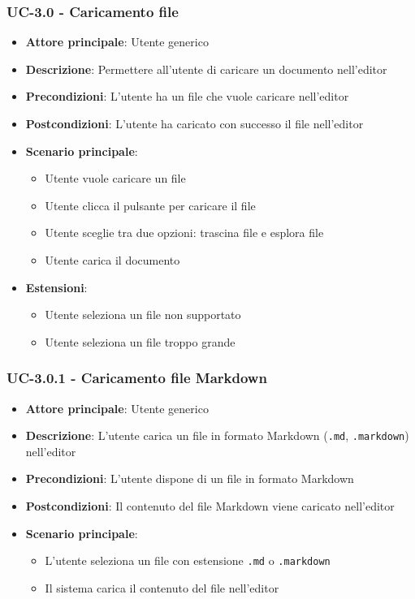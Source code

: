 \documentclass[11pt,a4paper]{article}
\begin{document}
\subsubsection{UC-3.0 - Caricamento file}
\begin{itemize}
    \item \textbf{Attore principale}: Utente generico
    \item \textbf{Descrizione}: Permettere all'utente di caricare un documento nell'editor
    \item \textbf{Precondizioni}: L'utente ha un file che vuole caricare nell'editor
    \item \textbf{Postcondizioni}: L'utente ha caricato con successo il file nell'editor
    \item \textbf{Scenario principale}:
        \begin{itemize}
            \item Utente vuole caricare un file
            \item Utente clicca il pulsante per caricare il file
            \item Utente sceglie tra due opzioni: trascina file e esplora file
            \item Utente carica il documento
        \end{itemize}
    \item \textbf{Estensioni}:
        \begin{itemize}
            \item Utente seleziona un file non supportato
            \item Utente seleziona un file troppo grande
        \end{itemize}
\end{itemize}

\subsubsection{UC-3.0.1 - Caricamento file Markdown}
\begin{itemize}
    \item \textbf{Attore principale}: Utente generico
    \item \textbf{Descrizione}: L'utente carica un file in formato Markdown (\texttt{.md}, \texttt{.markdown}) nell'editor
    \item \textbf{Precondizioni}: L'utente dispone di un file in formato Markdown
    \item \textbf{Postcondizioni}: Il contenuto del file Markdown viene caricato nell'editor
    \item \textbf{Scenario principale}:
        \begin{itemize}
            \item L'utente seleziona un file con estensione \texttt{.md} o \texttt{.markdown}
            \item Il sistema carica il contenuto del file nell'editor
        \end{itemize}
\end{itemize}
\end{document}
